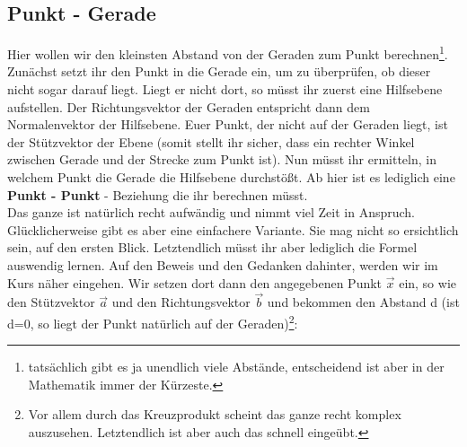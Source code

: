 \subsection{Punkt - Gerade}
	Hier wollen wir den kleinsten Abstand von der Geraden zum Punkt
	berechnen\footnote{tatsächlich gibt es ja unendlich viele Abstände,
	entscheidend ist aber in der Mathematik immer der Kürzeste.}.\\
	Zunächst setzt ihr den Punkt in die Gerade ein, um zu überprüfen, ob dieser
	nicht sogar darauf liegt. Liegt er nicht dort, so müsst ihr zuerst eine
	Hilfsebene aufstellen. Der Richtungsvektor der Geraden entspricht dann dem
	Normalenvektor der Hilfsebene. Euer Punkt, der nicht auf der Geraden liegt, ist
	der Stützvektor der Ebene (somit stellt ihr sicher, dass ein rechter Winkel
	zwischen Gerade und der Strecke zum Punkt ist). Nun müsst ihr ermitteln, in
	welchem Punkt die Gerade die Hilfsebene durchstößt. Ab hier ist es lediglich
	eine \textbf{Punkt - Punkt} - Beziehung die ihr berechnen müsst.\\
	Das ganze ist natürlich recht aufwändig und nimmt viel Zeit in Anspruch.
	Glücklicherweise gibt es aber eine einfachere Variante. Sie mag nicht so
	ersichtlich sein, auf den ersten Blick. Letztendlich müsst ihr aber lediglich
	die Formel auswendig lernen. Auf den Beweis und den Gedanken dahinter, werden
	wir im Kurs näher eingehen. Wir setzen dort dann den angegebenen Punkt
	\(\vec{x}\) ein, so wie den Stützvektor \(\vec{a}\) und den Richtungsvektor
	\(\vec{b}\) und bekommen den Abstand d (ist d=0, so liegt der Punkt natürlich
	auf der Geraden)\footnote{Vor allem durch das Kreuzprodukt scheint das ganze
	recht komplex auszusehen. Letztendlich ist aber auch das schnell eingeübt.}:
	\formel{\[d=\frac{|(\vec{a}-\vec{x})\times \vec{b}|}{|\vec{b}|}\]}
